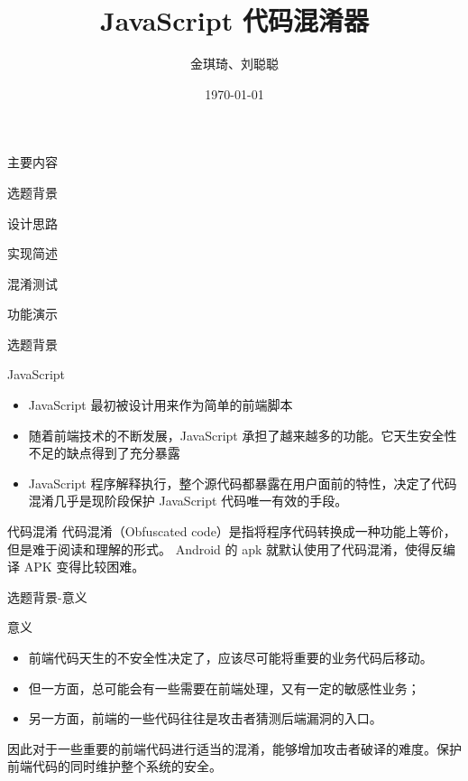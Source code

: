 \documentclass[presentation]{beamer}
\author{金琪琦、刘聪聪}
\date{\today}
\title{JavaScript 代码混淆器}
\begin{document}
\maketitle
\begin{frame}[label=sec-1]{主要内容}
\begin{block}{选题背景}
\end{block}
\begin{block}{设计思路}
\end{block}
\begin{block}{实现简述}
\end{block}
\begin{block}{混淆测试}
\end{block}
\begin{block}{功能演示}
\end{block}
\end{frame}
\begin{frame}[label=sec-2]{选题背景}
\begin{block}{JavaScript}
\begin{itemize}
\item JavaScript 最初被设计用来作为简单的前端脚本
\item 随着前端技术的不断发展，JavaScript 承担了越来越多的功能。它天生安全性不足的缺点得到了充分暴露
\item JavaScript 程序解释执行，整个源代码都暴露在用户面前的特性，决定了代码混淆几乎是现阶段保护 JavaScript 代码唯一有效的手段。
\end{itemize}
\end{block}
\begin{block}{代码混淆}
代码混淆（Obfuscated code）是指将程序代码转换成一种功能上等价，但是难于阅读和理解的形式。
Android 的 apk 就默认使用了代码混淆，使得反编译 APK 变得比较困难。
\end{block}
\end{frame}
\begin{frame}[label=sec-3]{选题背景-意义}
\begin{block}{意义}
\begin{itemize}
\item 前端代码天生的不安全性决定了，应该尽可能将重要的业务代码后移动。
\item 但一方面，总可能会有一些需要在前端处理，又有一定的敏感性业务；
\item 另一方面，前端的一些代码往往是攻击者猜测后端漏洞的入口。
\end{itemize}

因此对于一些重要的前端代码进行适当的混淆，能够增加攻击者破译的难度。保护前端代码的同时维护整个系统的安全。
\end{block}
\end{frame}
\end{document}
